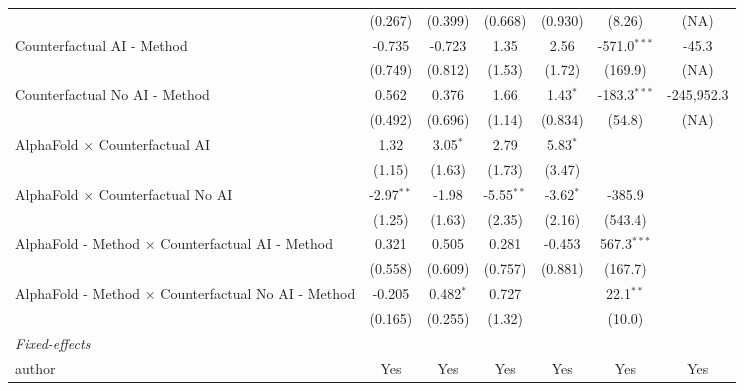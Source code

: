 \begin{tabular}{lcccccc}
                                                              & (0.267)      & (0.399)       & (0.668)       & (0.930)     & (8.26)         & (NA)\\   
   Counterfactual AI - Method                                 & -0.735       & -0.723        & 1.35          & 2.56        & -571.0$^{***}$ & -45.3\\   
                                                              & (0.749)      & (0.812)       & (1.53)        & (1.72)      & (169.9)        & (NA)\\   
   Counterfactual No AI - Method                              & 0.562        & 0.376         & 1.66          & 1.43$^{*}$  & -183.3$^{***}$ & -245,952.3\\   
                                                              & (0.492)      & (0.696)       & (1.14)        & (0.834)     & (54.8)         & (NA)\\   
   AlphaFold $\times$ Counterfactual AI                       & 1.32         & 3.05$^{*}$    & 2.79          & 5.83$^{*}$  &                &   \\   
                                                              & (1.15)       & (1.63)        & (1.73)        & (3.47)      &                &   \\   
   AlphaFold $\times$ Counterfactual No AI                    & -2.97$^{**}$ & -1.98         & -5.55$^{**}$  & -3.62$^{*}$ & -385.9         &   \\   
                                                              & (1.25)       & (1.63)        & (2.35)        & (2.16)      & (543.4)        &   \\   
   AlphaFold - Method $\times$ Counterfactual AI - Method     & 0.321        & 0.505         & 0.281         & -0.453      & 567.3$^{***}$  &   \\   
                                                              & (0.558)      & (0.609)       & (0.757)       & (0.881)     & (167.7)        &   \\   
   AlphaFold - Method $\times$ Counterfactual No AI - Method  & -0.205       & 0.482$^{*}$   & 0.727         &             & 22.1$^{**}$    &   \\   
                                                              & (0.165)      & (0.255)       & (1.32)        &             & (10.0)         &   \\   
   \midrule
   \emph{Fixed-effects}\\
   author                                                     & Yes          & Yes           & Yes           & Yes         & Yes            & Yes\\  

\end{tabular}
